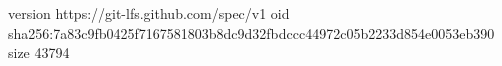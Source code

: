 version https://git-lfs.github.com/spec/v1
oid sha256:7a83c9fb0425f7167581803b8dc9d32fbdccc44972c05b2233d854e0053eb390
size 43794
